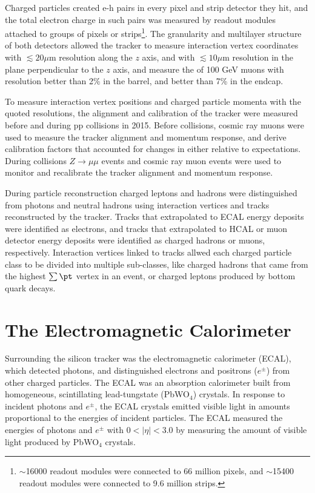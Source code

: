 Charged particles created e-h pairs in every pixel and strip detector they hit, and the total electron charge in such pairs was measured by readout 
modules attached to groups of pixels or strips\footnote{$\sim$16000 readout modules were connected to 66 million pixels, 
and $\sim$15400 readout modules were connected to 9.6 million strips.}.  
The granularity and multilayer structure of both detectors allowed the tracker to measure interaction vertex coordinates 
with $\lesssim 20\mu$m resolution along the $z$ axis, and with $\lesssim 10\mu$m resolution in the plane perpendicular to 
the $z$ axis, and measure the \pt of 100 GeV \pt muons with resolution better than 2\% in the barrel, and better than 
7\% in the endcap.

To measure interaction vertex positions and charged particle momenta with the quoted resolutions, the alignment and calibration 
of the tracker were measured before and during pp collisions in 2015.  Before collisions, cosmic ray muons were 
used to measure the tracker alignment and momentum response, and derive calibration factors that accounted for 
changes in either relative to expectations.  During collisions $Z \rightarrow \mu\mu$ events and cosmic ray muon events 
were used to monitor and recalibrate the tracker alignment and momentum response.

During particle reconstruction charged leptons and hadrons were distinguished from photons and neutral hadrons using 
interaction vertices and tracks reconstructed by the tracker.  Tracks that extrapolated to ECAL energy deposits were 
identified as electrons, and tracks that extrapolated to HCAL or muon detector energy deposits were identified as charged 
hadrons or muons, respectively.  Interaction vertices linked to tracks allwed each charged particle class to be divided 
into multiple sub-classes, like charged hadrons that came from the highest $\sum \pt$ vertex in an event, or charged 
leptons produced by bottom quark decays.

\section{The Electromagnetic Calorimeter}
\label{sec:ecalDescription}

Surrounding the silicon tracker was the electromagnetic calorimeter (ECAL), which detected photons, and distinguished
electrons and positrons ($e^{\pm}$) from other charged particles.  
The ECAL was an absorption calorimeter built from homogeneous, scintillating lead-tungstate (PbWO$_{4}$) crystals.  
In response to incident photons and $e^{\pm}$, the ECAL crystals emitted visible light in amounts proportional to 
the energies of incident particles.  The ECAL measured the energies of photons and $e^{\pm}$ with $0 < |\eta| < 3.0$ by 
measuring the amount of visible light produced by PbWO$_{4}$ crystals.

